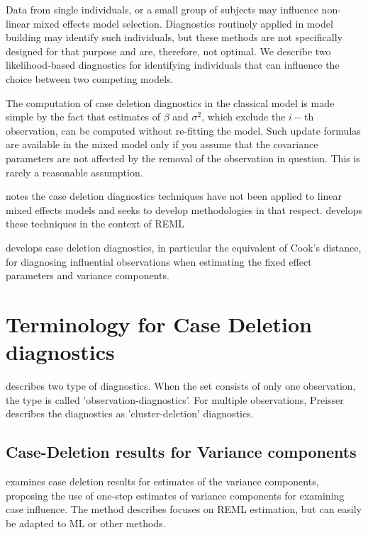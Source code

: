 \documentclass[12pt, a4paper]{report}
\theoremstyle{plain}
\theoremstyle{definition}
\theoremstyle{remark}
\begin{document}
Data from single individuals, or a small group of subjects may influence non-linear mixed effects model selection. Diagnostics routinely applied in model building may identify such individuals, but these methods are not specifically designed for that purpose and are, therefore, not optimal. We describe two likelihood-based diagnostics for identifying individuals that can influence the choice between two competing models.


The computation of case deletion diagnostics in the classical model is made simple by the fact that estimates of $\beta$ and $\sigma^2$, which exclude the $i-$th observation, can be computed without re-fitting the model. Such update formulas are available in the mixed model only if you assume that the covariance parameters are not affected by the removal of the observation in question. This is rarely a reasonable assumption.

\citet{Christiansen} notes the case deletion diagnostics techniques have not been applied to linear mixed effects models and seeks to develop methodologies in that respect. \citet{Christiansen} develops these techniques in the context of REML

\citet{Christiansen} develops  case deletion diagnostics, in particular the equivalent of  Cook's distance, for diagnosing influential observations when estimating the fixed effect parameters and variance components.


	\section{Terminology for Case Deletion diagnostics}
	
	\citet{preisser} describes two type of diagnostics. When the set
	consists of only one observation, the type is called
	'observation-diagnostics'. For multiple observations, Preisser
	describes the diagnostics as 'cluster-deletion' diagnostics.
	
	
	\subsection{Case-Deletion results for Variance components}
	\citet{Christensen}examines case deletion results for estimates of
	the variance components, proposing the use of one-step estimates
	of variance components for examining case influence. The method
	describes focuses on REML estimation, but can easily be adapted to
	ML or other methods.
	
\end{document}
